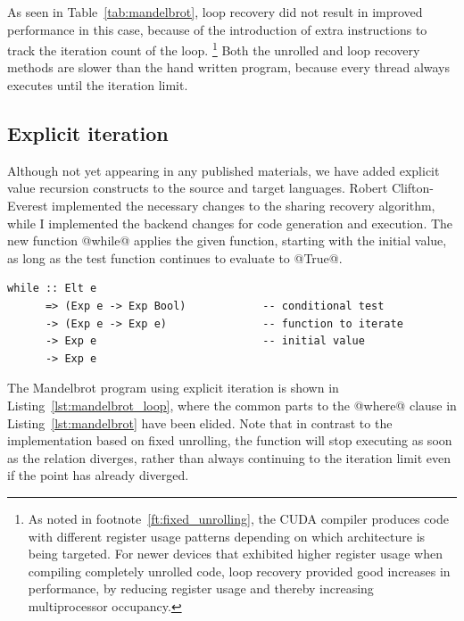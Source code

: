 As seen in Table~\ref{tab:mandelbrot}, loop recovery did not result in improved
performance in this case, because of the introduction of extra instructions to
track the iteration count of the loop.%
\footnote{As noted in footnote~\ref{ft:fixed_unrolling}, the CUDA compiler
produces code with different register usage patterns depending on which
architecture is being targeted. For newer devices that exhibited higher register
usage when compiling completely unrolled code, loop recovery provided good
increases in performance, by reducing register usage and thereby increasing
multiprocessor occupancy.}
Both the unrolled and loop recovery methods are slower than the hand written
program, because every thread always executes until the iteration limit.



\subsection{Explicit iteration}

Although not yet appearing in any published materials, we have added
explicit value recursion constructs to the source and target languages. Robert
Clifton-Everest implemented the necessary changes to the sharing recovery
algorithm, while I implemented the backend changes for code generation and
execution. The new function @while@ applies the given function, starting with
the initial value, as long as the test function continues to evaluate to @True@.
%
\begin{lstlisting}[style=haskell]
while :: Elt e
      => (Exp e -> Exp Bool)            -- conditional test
      -> (Exp e -> Exp e)               -- function to iterate
      -> Exp e                          -- initial value
      -> Exp e
\end{lstlisting}
%
The Mandelbrot program using explicit iteration is shown in
Listing~\ref{lst:mandelbrot_loop}, where the common parts to the @where@ clause
in Listing~\ref{lst:mandelbrot} have been elided. Note that in contrast to the
implementation based on fixed unrolling, the function will stop executing as
soon as the relation diverges, rather than always continuing to the iteration
limit even if the point has already diverged.

